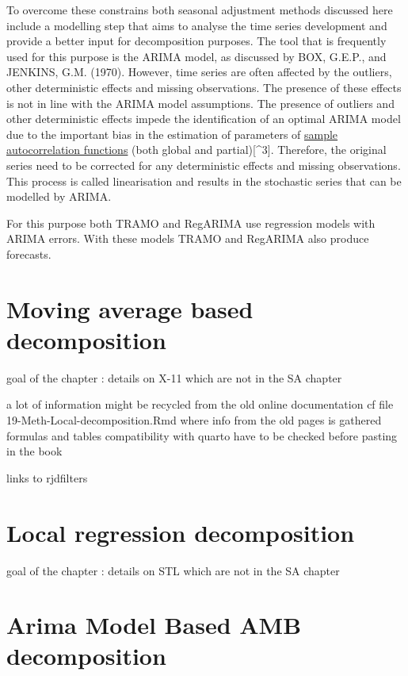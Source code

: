 \documentclass[
  letterpaper,
  DIV=11,
  numbers=noendperiod]{scrreprt}
\begin{document}
To overcome these constrains both seasonal adjustment methods discussed
here include a modelling step that aims to analyse the time series
development and provide a better input for decomposition purposes. The
tool that is frequently used for this purpose is the ARIMA model, as
discussed by BOX, G.E.P., and JENKINS, G.M. (1970). However, time series
are often affected by the outliers, other deterministic effects and
missing observations. The presence of these effects is not in line with
the ARIMA model assumptions. The presence of outliers and other
deterministic effects impede the identification of an optimal ARIMA
model due to the important bias in the estimation of parameters of
\href{../theory/ACF_and_PACF.html}{sample autocorrelation functions}
(both global and partial){[}\^{}3{]}. Therefore, the original series
need to be corrected for any deterministic effects and missing
observations. This process is called linearisation and results in the
stochastic series that can be modelled by ARIMA.

For this purpose both TRAMO and RegARIMA use regression models with
ARIMA errors. With these models TRAMO and RegARIMA also produce
forecasts.

\hypertarget{moving-average-based-decomposition}{%
\chapter{Moving average based
decomposition}\label{moving-average-based-decomposition}}

goal of the chapter : details on X-11 which are not in the SA chapter

a lot of information might be recycled from the old online documentation
cf file 19-Meth-Local-decomposition.Rmd where info from the old pages is
gathered formulas and tables compatibility with quarto have to be
checked before pasting in the book

links to rjdfilters

\hypertarget{local-regression-decomposition}{%
\chapter{Local regression
decomposition}\label{local-regression-decomposition}}

goal of the chapter : details on STL which are not in the SA chapter

\hypertarget{arima-model-based-amb-decomposition-1}{%
\chapter{Arima Model Based AMB
decomposition}\label{arima-model-based-amb-decomposition-1}}
\end{document}
